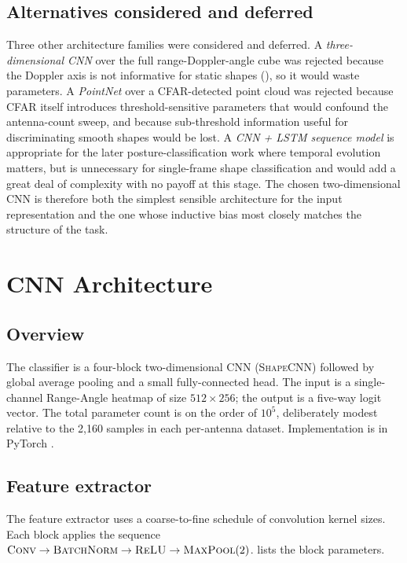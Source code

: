 \documentclass[letterpaper,11pt,leqno]{article}
\begin{document}
\subsection{Alternatives considered and deferred}

Three other architecture families were considered and deferred. A \emph{three-dimensional CNN} over the full range-Doppler-angle cube was rejected because the Doppler axis is not informative for static shapes (), so it would waste parameters. A \emph{PointNet} \citep{Qi17} over a CFAR-detected point cloud was rejected because CFAR itself introduces threshold-sensitive parameters that would confound the antenna-count sweep, and because sub-threshold information useful for discriminating smooth shapes would be lost. A \emph{CNN + LSTM sequence model} is appropriate for the later posture-classification work where temporal evolution matters, but is unnecessary for single-frame shape classification and would add a great deal of complexity with no payoff at this stage. The chosen two-dimensional CNN is therefore both the simplest sensible architecture for the input representation and the one whose inductive bias most closely matches the structure of the task.

\section{CNN Architecture}\label{s:architecture}

\subsection{Overview}

The classifier is a four-block two-dimensional CNN (\textsc{ShapeCNN}) followed by global average pooling and a small fully-connected head. The input is a single-channel Range-Angle heatmap of size $512\times 256$; the output is a five-way logit vector. The total parameter count is on the order of $10^5$, deliberately modest relative to the 2{,}160 samples in each per-antenna dataset. Implementation is in PyTorch \citep{Paszke19}.

\subsection{Feature extractor}

The feature extractor uses a coarse-to-fine schedule of convolution kernel sizes. Each block applies the sequence $\textsc{Conv} \to \textsc{BatchNorm} \to \textsc{ReLU} \to \textsc{MaxPool}(2)$.  lists the block parameters.
\end{document}

